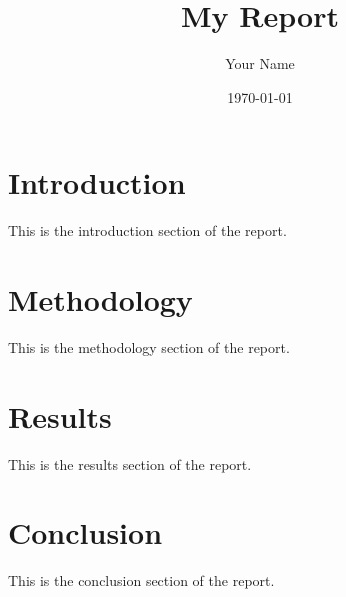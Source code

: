 \documentclass{article}
\title{My Report}
\author{Your Name}
\date{\today}
\begin{document}
\maketitle

\section{Introduction}
This is the introduction section of the report.

\section{Methodology}
This is the methodology section of the report.

\section{Results}
This is the results section of the report.

\section{Conclusion}
This is the conclusion section of the report.
\end{document}
